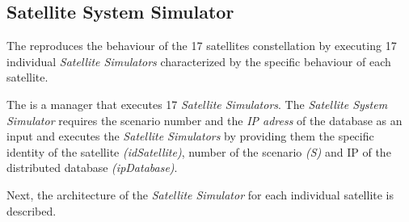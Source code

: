 \subsection{Satellite System Simulator}

The \satss reproduces the behaviour of the 17 satellites constellation by executing 17 individual \emph{Satellite Simulators} characterized by the specific behaviour of each satellite. 

The \satss is a manager that executes 17 \emph{Satellite Simulators}. The
\emph{Satellite System Simulator} requires the scenario number and the \emph{IP adress} of the database as an input and executes the \emph{Satellite Simulators} by providing them the specific identity of the satellite \emph{(idSatellite)}, number of the scenario \emph{(S)} and IP of the distributed database  \emph{(ipDatabase)}.

Next, the architecture of the \emph{Satellite Simulator} for each individual
satellite is described.

